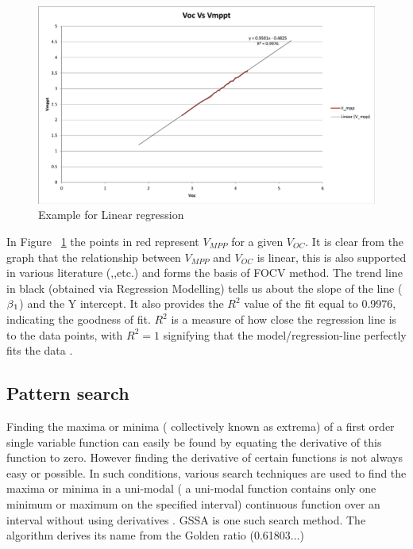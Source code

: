 {\begin{figure}[H]
  \begin{center}
  \includegraphics[width=\textwidth]{images/Reg_line}
  \caption{ Example for Linear regression }
  \label{fig:linear_regression}
  \end{center}
  \end{figure}


In Figure ~\ref{fig:linear_regression} the points in red represent $V_{MPP}$ for a given $V_{OC}$. It is clear from the graph that the relationship between $V_{MPP}$ and $V_{OC}$ is linear, this is also supported in various literature (\cite{reza2013classification},\cite{esram2007comparison},etc.) and forms the basis of \ac{FOCV} method. The trend line in black (obtained via Regression Modelling) tells us about the slope of the line ($\beta\textsubscript{1}$) and the Y intercept. It also provides the $R^{2}$ value of the fit equal to 0.9976, indicating the goodness of fit. $R^{2}$ is a measure of how close the regression line is to the data points, with $R^{2} = 1 $ signifying that the model/regression-line perfectly fits the data \cite{Jim_R_squared}.


\subsection{Pattern search}


Finding the maxima or minima ( collectively known as extrema) of a first order single variable function can easily be found by equating the derivative of this function to zero. However finding the derivative of certain functions is not always easy or possible. In such conditions, various search techniques are used to find the maxima or minima  in a uni-modal ( a uni-modal function contains only one minimum or maximum on the specified interval) continuous function over an interval without using derivatives \cite{seiler1989numerical}. \ac{GSSA} is one such search method. The algorithm derives its name from the Golden ratio (0.61803...)\\

}
